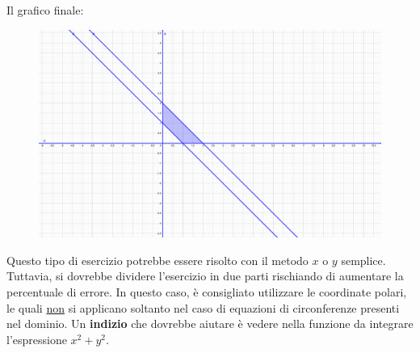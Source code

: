 \documentclass[a4paper]{article}
\begin{document}
	\noindent
	Il grafico finale:
	\begin{figure}[!htp]
		\centering
		\includegraphics[width=.7\textwidth]{img/integrali_doppi-coordinate_polari-5.pdf}
	\end{figure}

	\noindent
	Questo tipo di esercizio potrebbe essere risolto con il metodo $x$ o $y$ semplice. Tuttavia, si dovrebbe dividere l'esercizio in due parti rischiando di aumentare la percentuale di errore. In questo caso, è consigliato utilizzare le coordinate polari, le quali \underline{non} si applicano soltanto nel caso di equazioni di circonferenze presenti nel dominio. Un \textbf{indizio} che dovrebbe aiutare è vedere nella funzione da integrare l'espressione $x^{2}+y^{2}$.\newline
\end{document}
